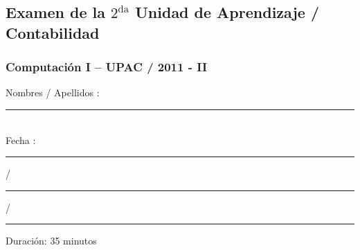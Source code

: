 \documentclass[10pt, a4paper]{article}
\begin{document}
\begin{center}
\subsection*{Examen de la $\text{2}^{\text{da}}$ Unidad de Aprendizaje / Contabilidad} 
\subsubsection*{Computación I – UPAC / 2011 - II} 
\end{center}

\noindent Nombres / Apellidos : \rule{10cm}{0.4pt} \\ 
Fecha : \rule{2cm}{0.4pt}  / \rule{2cm}{0.4pt} / \rule{2cm}{0.4pt} \hspace{3.4cm} Duración: {\small 35 minutos} \\
\end{document}
